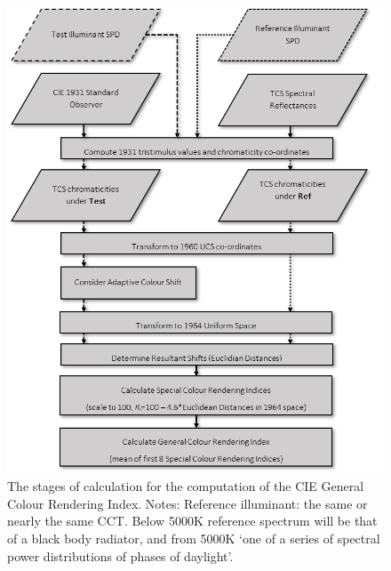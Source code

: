 \begin{figure}[htbp]
\includegraphics[max width=\textwidth]{figs/LitRev/criflow.png}
\caption{The stages of calculation for the computation of the \gls{CIE} General Colour Rendering Index. Notes: Reference illuminant: the same or nearly the same \gls{CCT}. Below 5000K reference spectrum will be that of a black body radiator, and from 5000K `one of a series of spectral power distributions of phases of daylight'.}
\label{fig:criflow}
\end{figure}

